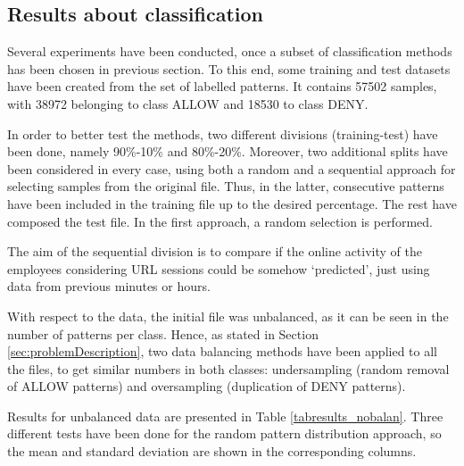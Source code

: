 \documentclass{llncs}
\begin{document}
\subsection{Results about classification}

\noindent Several experiments have been conducted, once a subset of classification methods has been chosen in previous section.
To this end, some training and test datasets have been created from
the set of labelled patterns. It contains 57502 samples, with 38972
belonging to class ALLOW and 18530 to class DENY.

In order to better test the methods, two different divisions (training-test) have been done, namely 90\%-10\% and 80\%-20\%. Moreover, two additional splits have been considered in every case, using both a random and a sequential approach for selecting samples from the original file. Thus, in the latter, consecutive patterns have been included in the training file up to the desired percentage. The rest have composed the test file. In the first approach, a random selection is performed.

The aim of the sequential division is to compare if the online activity of the employees considering URL sessions could be somehow `predicted', just using data from previous minutes or hours.

With respect to the data, the initial file was unbalanced, as it can be seen in the number of patterns per class. Hence, as stated in Section \ref{sec:problemDescription}, two data balancing methods have been applied to all the files, to get similar numbers in both classes: undersampling (random removal of ALLOW patterns) and oversampling (duplication of DENY patterns).

Results for unbalanced data are presented in Table \ref{tabresults_nobalan}.
Three different tests have been done for the random pattern distribution approach, so the mean and standard deviation are shown in the corresponding columns.
\end{document}
